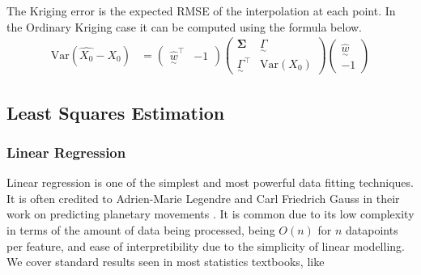 \documentclass[12pt,a4paper]{article} %
\newcommand{\ve}[1]{\underset{\sim}{#1}}
\begin{document}
The Kriging error is the expected RMSE of the interpolation at each point. In the Ordinary Kriging case it can be computed using the formula below.
\begin{align*}
    \text{Var}(\hat{X_0}-X_0)&=\begin{pmatrix}
        \hat{\ve{w}}^\top&-1
    \end{pmatrix}\begin{pmatrix}
        \pmb{\Sigma} & \ve{\Gamma}\\
        \ve{\Gamma}^\top & \text{Var}(X_0)
    \end{pmatrix}\begin{pmatrix}
        \hat{\ve{w}}\\
        -1
    \end{pmatrix}
\end{align*}

\subsection{Least Squares Estimation}
\label{subsec:lse}
\subsubsection{Linear Regression}
\label{subsec:linear_reg}
Linear regression is one of the simplest and most powerful data fitting techniques. It is often credited to Adrien-Marie Legendre and Carl Friedrich Gauss in their work on predicting planetary movements \cite{linear}. It is common due to its low complexity in terms of the amount of data being processed, being $O(n)$ for $n$ datapoints per feature, and ease of interpretibility due to the simplicity of linear modelling. We cover standard results seen in most statistics textbooks, like \cite{stats}
\end{document}
